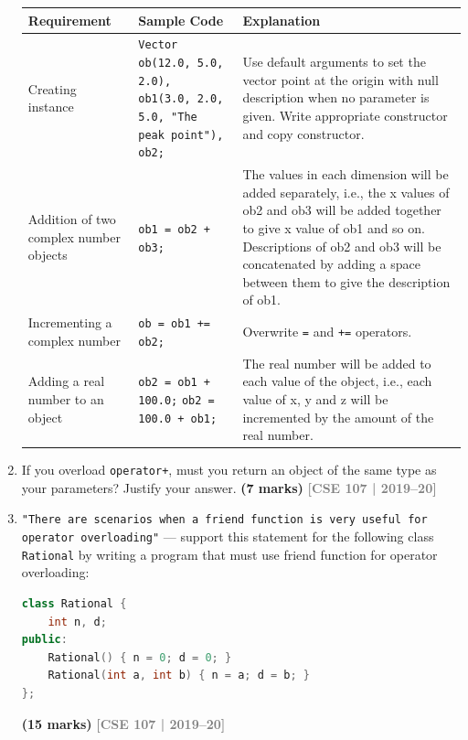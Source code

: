 \documentclass[12pt,a3paper]{article}
\newcommand{\yr}[1]{\hfill\textcolor{gray}{\small\textbf{[#1]}}}
\newcommand{\mk}[1]{\textcolor{orange!70!black}{\small\textbf{(#1 marks)}}}
\begin{document}
\begin{enumerate}
\begin{center}
\renewcommand{\arraystretch}{1.3}
\begin{tabular}{|p{}|p{}|p{}|}
\hline
Requirement & Sample Code & Explanation \\
\hline
Creating instance & \texttt{Vector ob(12.0, 5.0, 2.0), ob1(3.0, 2.0, 5.0, "The peak point"), ob2;} & Use default arguments to set the vector point at the origin with null description when no parameter is given. Write appropriate constructor and copy constructor. \\
\hline
Addition of two complex number objects & \texttt{ob1 = ob2 + ob3;} & The values in each dimension will be added separately, i.e., the x values of ob2 and ob3 will be added together to give x value of ob1 and so on. Descriptions of ob2 and ob3 will be concatenated by adding a space between them to give the description of ob1. \\
\hline
Incrementing a complex number & \texttt{ob = ob1 += ob2;} & Overwrite \texttt{=} and \texttt{+=} operators. \\
\hline
Adding a real number to an object & \texttt{ob2 = ob1 + 100.0;} \newline \texttt{ob2 = 100.0 + ob1;} & The real number will be added to each value of the object, i.e., each value of x, y and z will be incremented by the amount of the real number. \\
\hline
\end{tabular}
\end{center}




\item If you overload \texttt{operator+}, must you return an object of the same type as your parameters? Justify your answer. \mk{7}
\yr{CSE 107 | 2019--20}





\item \texttt{"There are scenarios when a friend function is very useful for operator overloading"} --- support this statement for the following class \texttt{Rational} by writing a program that must use friend function for operator overloading:
\begin{lstlisting}[language=C++]
class Rational {
    int n, d;
public:
    Rational() { n = 0; d = 0; }
    Rational(int a, int b) { n = a; d = b; }
};
\end{lstlisting}
\mk{15}
\yr{CSE 107 | 2019--20}



\end{enumerate}
\end{document}
